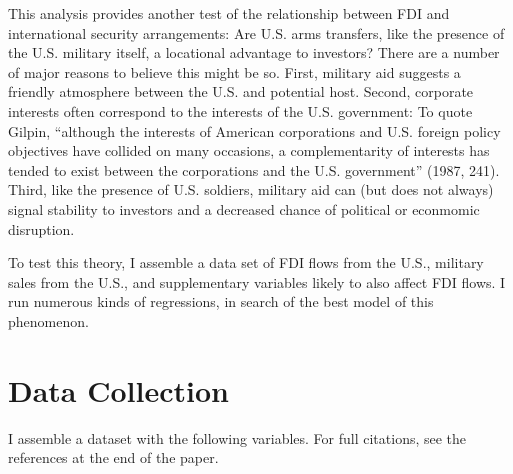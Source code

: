 \documentclass[11pt,]{article}
\begin{document}
This analysis provides another test of the relationship between FDI and
international security arrangements: Are U.S. arms transfers, like the
presence of the U.S. military itself, a locational advantage to
investors? There are a number of major reasons to believe this might be
so. First, military aid suggests a friendly atmosphere between the U.S.
and potential host. Second, corporate interests often correspond to the
interests of the U.S. government: To quote Gilpin, ``although the
interests of American corporations and U.S. foreign policy objectives
have collided on many occasions, a complementarity of interests has
tended to exist between the corporations and the U.S. government''
(1987, 241). Third, like the presence of U.S. soldiers, military aid can
(but does not always) signal stability to investors and a decreased
chance of political or econmomic disruption.

To test this theory, I assemble a data set of FDI flows from the U.S.,
military sales from the U.S., and supplementary variables likely to also
affect FDI flows. I run numerous kinds of regressions, in search of the
best model of this phenomenon.

\hypertarget{data-collection}{%
\section{Data Collection}\label{data-collection}}

I assemble a dataset with the following variables. For full citations,
see the references at the end of the paper.
\end{document}
